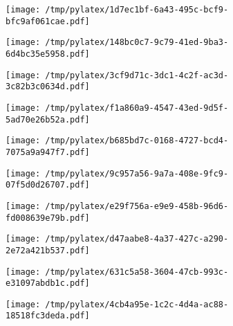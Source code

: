 \documentclass{article}
\begin{document}
\begin{figure}[htbp]
\begin{subfigure}[b]{.3\linewidth}
\texttt{[image: /tmp/pylatex/1d7ec1bf-6a43-495c-bcf9-bfc9af061cae.pdf]}
\end{subfigure}
\begin{subfigure}[b]{.3\linewidth}
\texttt{[image: /tmp/pylatex/148bc0c7-9c79-41ed-9ba3-6d4bc35e5958.pdf]}
\end{subfigure}
\begin{subfigure}[b]{.3\linewidth}
\texttt{[image: /tmp/pylatex/3cf9d71c-3dc1-4c2f-ac3d-3c82b3c0634d.pdf]}
\end{subfigure}
\begin{subfigure}[b]{.3\linewidth}
\texttt{[image: /tmp/pylatex/f1a860a9-4547-43ed-9d5f-5ad70e26b52a.pdf]}
\end{subfigure}
\begin{subfigure}[b]{.3\linewidth}
\texttt{[image: /tmp/pylatex/b685bd7c-0168-4727-bcd4-7075a9a947f7.pdf]}
\end{subfigure}
\begin{subfigure}[b]{.3\linewidth}
\texttt{[image: /tmp/pylatex/9c957a56-9a7a-408e-9fc9-07f5d0d26707.pdf]}
\end{subfigure}
\begin{subfigure}[b]{.3\linewidth}
\texttt{[image: /tmp/pylatex/e29f756a-e9e9-458b-96d6-fd008639e79b.pdf]}
\end{subfigure}
\begin{subfigure}[b]{.3\linewidth}
\texttt{[image: /tmp/pylatex/d47aabe8-4a37-427c-a290-2e72a421b537.pdf]}
\end{subfigure}
\begin{subfigure}[b]{.3\linewidth}
\texttt{[image: /tmp/pylatex/631c5a58-3604-47cb-993c-e31097abdb1c.pdf]}
\end{subfigure}
\begin{subfigure}[b]{.3\linewidth}
\texttt{[image: /tmp/pylatex/4cb4a95e-1c2c-4d4a-ac88-18518fc3deda.pdf]}
\end{subfigure}
\end{figure}
\end{document}
